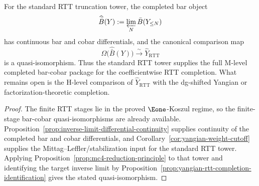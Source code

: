 \begin{corollary}
\label{cor:yangian-standard-mc4-package}
For the standard RTT truncation tower, the completed bar object
\[
\widehat{\bar B}(Y) := \varprojlim_N \bar B(Y_{\le N})
\]
has continuous bar and cobar differentials, and the canonical
comparison map
\[
\Omega\bigl(\widehat{\bar B}(Y)\bigr) \xrightarrow{\sim}
\widehat Y_{\mathrm{RTT}}
\]
is a quasi-isomorphism.
Thus the standard RTT tower supplies the full M-level completed
bar-cobar package for the coefficientwise RTT completion.  What remains
open is the H-level comparison of $\widehat Y_{\mathrm{RTT}}$ with the
dg-shifted Yangian or factorization-theoretic completion.
\end{corollary}

\begin{proof}
The finite RTT stages lie in the proved $\Eone$-Koszul regime, so the
finite-stage bar-cobar quasi-isomorphisms are already available.
Proposition~\ref{prop:inverse-limit-differential-continuity} supplies
continuity of the completed bar and cobar differentials, and
Corollary~\ref{cor:yangian-weight-cutoff} supplies the
Mittag--Leffler/stabilization input for the standard RTT tower.
Applying Proposition~\ref{prop:mc4-reduction-principle} to that tower
and identifying the target inverse limit by
Proposition~\ref{prop:yangian-rtt-completion-identification} gives the
stated quasi-isomorphism.
\end{proof}

